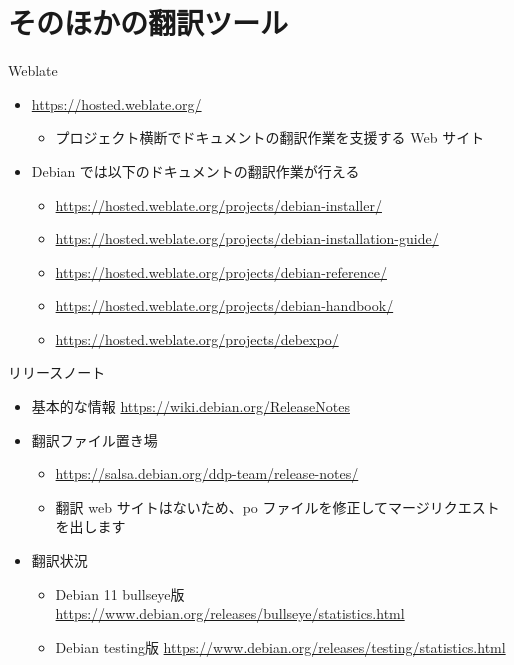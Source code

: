 \section{そのほかの翻訳ツール}

\begin{frame}{Weblate}
  \begin{itemize}
  \item \url{https://hosted.weblate.org/}
    \begin{itemize}    
    \item プロジェクト横断でドキュメントの翻訳作業を支援する Web サイト
    \end{itemize}      
  \item Debian では以下のドキュメントの翻訳作業が行える
    \begin{itemize}
    \item \url{https://hosted.weblate.org/projects/debian-installer/}
    \item \url{https://hosted.weblate.org/projects/debian-installation-guide/}
    \item \url{https://hosted.weblate.org/projects/debian-reference/}
    \item \url{https://hosted.weblate.org/projects/debian-handbook/}
    \item \url{https://hosted.weblate.org/projects/debexpo/}
    \end{itemize}
  \end{itemize}
\end{frame}


\begin{frame}{リリースノート}
  \begin{itemize}
  \item 基本的な情報 \url{https://wiki.debian.org/ReleaseNotes}
  \item 翻訳ファイル置き場
    \begin{itemize}
    \item \url{https://salsa.debian.org/ddp-team/release-notes/}
    \item 翻訳 web サイトはないため、po ファイルを修正してマージリクエストを出します
    \end{itemize}
  \item 翻訳状況
    \begin{itemize}
    \item Debian 11 bullseye版 \url{https://www.debian.org/releases/bullseye/statistics.html}
    \item Debian testing版 \url{https://www.debian.org/releases/testing/statistics.html}
    \end{itemize}
  \end{itemize}
\end{frame}
  
